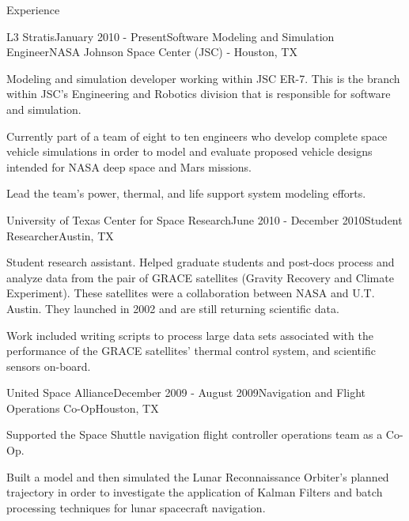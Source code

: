 \documentclass{resume} %
\begin{document}
\begin{rSection}{Experience}

\begin{rSubsection}{L3 Stratis}{January 2010 - Present}{Software Modeling and Simulation Engineer}{NASA Johnson Space Center (JSC) - Houston, TX}
\item Modeling and simulation developer working within JSC ER-7. This is the branch within JSC's
Engineering and Robotics division that is responsible for software and simulation.
\item Currently part of a team of eight to ten engineers who develop complete space vehicle simulations in order to model and evaluate proposed vehicle designs intended for NASA deep space and Mars missions.
\item Lead the team's power, thermal, and life support system modeling efforts.
\end{rSubsection}


\begin{rSubsection}{University of Texas Center for Space Research}{June 2010 - December 2010}{Student Researcher}{Austin, TX}
\item Student research assistant. Helped graduate students and post-docs process and analyze data from 
the pair of GRACE satellites (Gravity Recovery and Climate Experiment). These satellites were a collaboration between NASA and U.T. Austin. They launched in 2002 and are still returning scientific data.
\item Work included writing scripts to process large data sets associated with the performance
of the GRACE satellites' thermal control system, and scientific sensors on-board. 
\end{rSubsection}


\begin{rSubsection}{United Space Alliance}{December 2009 - August 2009}{Navigation and Flight Operations Co-Op}{Houston, TX}
\item Supported the Space Shuttle navigation flight controller operations team as a Co-Op.
\item Built a model and then simulated the Lunar Reconnaissance Orbiter's planned trajectory in order to investigate the application of Kalman Filters and batch processing techniques for lunar spacecraft navigation.
\end{rSubsection}


\end{rSection}
\end{document}
